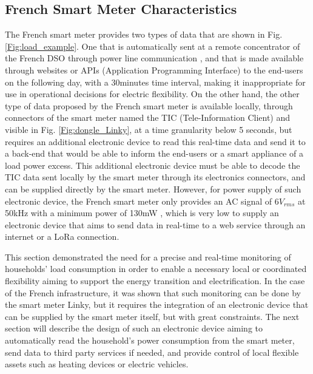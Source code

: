 \documentclass[conference]{IEEEtran}
\begin{document}
\subsection{French Smart Meter Characteristics}
The French smart meter provides two types of data that are shown in Fig. \ref{Fig:load_example}. One that is automatically sent at a remote concentrator of the French DSO through power line communication \cite{IEEE:LinkyInfrastructure}, and that is made available through websites or APIs (Application Programming Interface) to the end-users on the following day, with a 30minutes time interval, making it inappropriate for use in operational decisions for electric flexibility. On the other hand, the other type of data proposed by the French smart meter is available locally, through connectors of the smart meter named the TIC (Tele-Information Client) and visible in Fig. \ref{Fig:dongle_Linky}, at a time granularity below 5 seconds, but requires an additional electronic device to read this real-time data and send it to a back-end that would be able to inform the end-users or a smart appliance of a load power excess. This additional electronic device must be able to decode the TIC data sent locally by the smart meter through its electronics connectors, and can be supplied directly by the smart meter. However, for power supply of such electronic device, the French smart meter only provides an AC signal of 6$V_{rms}$ at 50kHz with a minimum power of 130mW \cite{Enedis:Linkyspec}, which is very low to supply an electronic device that aims to send data in real-time to a web service through an internet or a LoRa connection. 

This section demonstrated the need for a precise and real-time monitoring of households' load consumption in order to enable a necessary local or coordinated flexibility aiming to support the energy transition and electrification. In the case of the French infrastructure, it was shown that such monitoring can be done by the smart meter Linky, but it requires the integration of an electronic device that can be supplied by the smart meter itself, but with great constraints. The next section will describe the design of such an electronic device aiming to automatically read the household's power consumption from the smart meter, send data to third party services if needed, and provide control of local flexible assets such as heating devices or electric vehicles.
\end{document}

